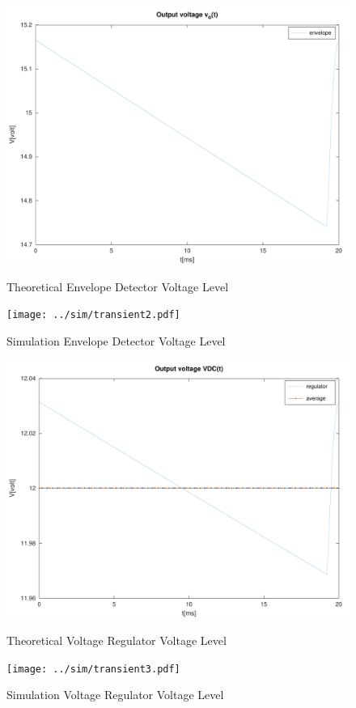 \begin{figure}[H]
      \includegraphics[width=\linewidth]{../mat/envelope.pdf}
      \caption{Theoretical Envelope Detector Voltage Level}
    \endminipage\hfill
      \texttt{[image: ../sim/transient2.pdf]}
      \caption{Simulation Envelope Detector Voltage Level}
    \endminipage\hfill
\end{figure}

\begin{figure}[H]
      \includegraphics[width=\linewidth]{../mat/outputdc.pdf}
      \caption{Theoretical Voltage Regulator Voltage Level}
    \endminipage\hfill
      \texttt{[image: ../sim/transient3.pdf]}
      \caption{Simulation Voltage Regulator Voltage Level}
    \endminipage\hfill
\end{figure}

